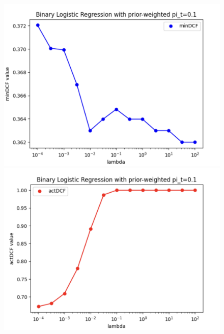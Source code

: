 \documentclass{article}
\begin{document}
    \begin{figure}[H]
        \centering
        \begin{minipage}{.27\textwidth}
            \centering
            \includegraphics[width=\linewidth]{./img/LLR_W1.png}
        \end{minipage}%
        \begin{minipage}{.27\textwidth}
            \centering
            \includegraphics[width=\linewidth]{./img/LLR_W2.png}
        \end{minipage}
        \begin{minipage}{.27\textwidth}
            \centering

\end{minipage}
\end{figure}
\end{document}
